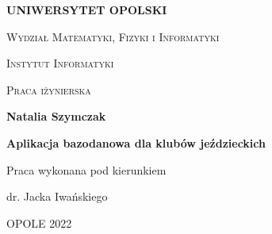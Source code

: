 \documentclass[12pt,oneside]{report}
\begin{document}
	\begin{titlepage}
		
		\begin{center}
			\begin{figure}[t]
				\centering
			\end{figure}
		\end{center}
		
		\begin{center}
			{\LARGE  \bf \textsc{UNIWERSYTET OPOLSKI}}
		\end{center}
		\vspace{0.2cm}
		\begin{center}
			{\large \textsc{Wydział Matematyki, Fizyki i Informatyki}}
		\end{center}
		\begin{center}
			{\Large \textsc{Instytut Informatyki}}
		\end{center}
		\vspace{0.5cm}
		\begin{center}
			\large    \textsc{Praca iżynierska}
		\end{center}
		\vspace{0.4cm}
		\begin{center}
			\large \textbf{Natalia Szymczak}
		\end{center}
		
		\vspace{0.4cm}
		\begin{center}
			\Large     \textbf{Aplikacja bazodanowa dla klubów jeździeckich}
		\end{center}
		\vspace{0.1cm}
		
		\begin{center}
			\large     \textsc{}
		\end{center}
		\vspace{1.3cm}
		
		\begin{flushright}
			{\large Praca wykonana pod kierunkiem\bigskip
				
				{\bf }} 
			dr. Jacka Iwańskiego
		\end{flushright}
		\vspace{0.7cm}
		\begin{center}
			{\large OPOLE 2022}
		\end{center}
	\end{titlepage}

	\thispagestyle{empty}
	\mbox{}
	
\end{document}
